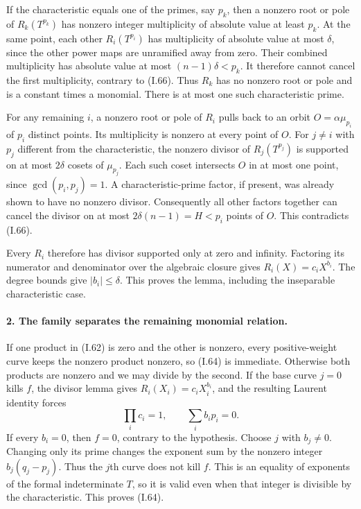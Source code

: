 If the characteristic equals one of the primes, say $p_k$,
then a nonzero root or pole of $R_k(T^{p_k})$ has nonzero
integer multiplicity of absolute value at least $p_k$.
At the same point, each other $R_i(T^{p_i})$ has multiplicity
of absolute value at most $\delta$, since the other power
maps are unramified away from zero.  Their combined
multiplicity has absolute value at most $(n-1)\delta<p_k$.
It therefore cannot cancel the first multiplicity, contrary
to (I.66).  Thus $R_k$ has no nonzero root or pole and is
a constant times a monomial.  There is at most one such
characteristic prime.

For any remaining $i$, a nonzero root or pole of $R_i$
pulls back to an orbit $O=\alpha\mu_{p_i}$ of $p_i$
distinct points.  Its multiplicity is nonzero at every
point of $O$.  For $j\ne i$ with $p_j$ different from the
characteristic, the nonzero divisor of $R_j(T^{p_j})$
is supported on at most $2\delta$ cosets of $\mu_{p_j}$.
Each such coset intersects $O$ in at most one point, since
$\gcd(p_i,p_j)=1$.  A characteristic-prime factor, if
present, was already shown to have no nonzero divisor.
Consequently all other factors together can cancel the
divisor on at most $2\delta(n-1)=H<p_i$ points of $O$.
This contradicts (I.66).

Every $R_i$ therefore has divisor supported only at zero
and infinity.  Factoring its numerator and denominator
over the algebraic closure gives $R_i(X)=c_iX^{b_i}$.
The degree bounds give $|b_i|\le\delta$.  This proves
the lemma, including the inseparable characteristic case.

\paragraph{2. The family separates the remaining monomial relation.}
If one product in (I.62) is zero and the other is nonzero,
every positive-weight curve keeps the nonzero product
nonzero, so (I.64) is immediate.  Otherwise both products
are nonzero and we may divide by the second.
If the base curve $j=0$ kills $f$, the divisor lemma gives
$R_i(X_i)=c_iX_i^{b_i}$, and the resulting Laurent identity
forces
\[
 \prod_i c_i=1,\qquad\sum_i b_ip_i=0.
\]
If every $b_i=0$, then $f=0$, contrary to the hypothesis.
Choose $j$ with $b_j\ne0$.  Changing only its prime changes
the exponent sum by the nonzero integer
$b_j(q_j-p_j)$.  Thus the $j$th curve does not kill $f$.
This is an equality of exponents of the formal indeterminate
$T$, so it is valid even when that integer is divisible by
the characteristic.  This proves (I.64).

